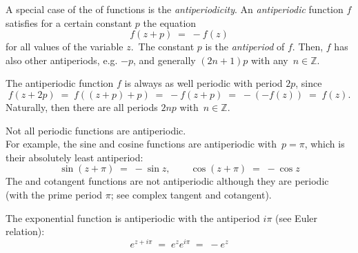 \documentclass[12pt]{article}
\theoremstyle{definition}
\begin{document}
A special case of the  of functions is the {\em antiperiodicity}.  
An {\em antiperiodic} function $f$ satisfies for a certain constant $p$ the equation
$$f(z+p) \;=\; -f(z)$$
for all values of the variable $z$.\, The constant $p$ is the {\em antiperiod} of $f$.  Then, $f$ has also other antiperiods,  e.g. $-p$, and generally $(2n\!+\!1)p$ with any\, $n \in \mathbb{Z}$.

The antiperiodic function $f$ is always as well periodic with period $2p$, since
$$f(z+2p) \;=\; f((z+p)+p) \;=\; -f(z+p) \;=\; -(-f(z)) \;=\;
f(z).$$
Naturally, then there are all periods $2np$ with\, $n \in \mathbb{Z}$.

Not all periodic functions are antiperiodic.\\

For example, the sine and cosine functions are antiperiodic with\, $p = \pi$, which is their absolutely least antiperiod:
$$\sin(z+\pi) \;=\; -\sin{z}, \qquad \cos(z+\pi) \;=\; -\cos{z}$$
The  and cotangent functions are not antiperiodic although they are periodic (with the prime period $\pi$; see complex tangent and cotangent).

The exponential function is antiperiodic with the antiperiod $i\pi$ (see Euler relation):
$$e^{z+i\pi}\;=\; e^z e^{i\pi} \;=\; -e^z$$
\end{document}
